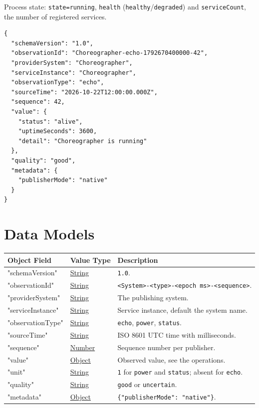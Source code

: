 \documentclass[a4paper]{arrowhead}
\newcommand{\oref}[1]{{\textcolor{ArrowheadBlue}{\hyperref[sec:operations:#1]{#1}}}}
\newcommand{\pref}[1]{{\textcolor{ArrowheadGrey}{\hyperref[sec:model:primitives:#1]{#1}}}}
\begin{document}
Process state: \texttt{state=\allowbreak{}running}, \texttt{health} (\texttt{healthy}/\texttt{degraded}) and \texttt{serviceCount}, the number of registered services.

\begin{lstlisting}[caption={An \oref{echo} observation.}]
{
  "schemaVersion": "1.0",
  "observationId": "Choreographer-echo-1792670400000-42",
  "providerSystem": "Choreographer",
  "serviceInstance": "Choreographer",
  "observationType": "echo",
  "sourceTime": "2026-10-22T12:00:00.000Z",
  "sequence": 42,
  "value": {
    "status": "alive",
    "uptimeSeconds": 3600,
    "detail": "Choreographer is running"
  },
  "quality": "good",
  "metadata": {
    "publisherMode": "native"
  }
}
\end{lstlisting}

\newpage

\section{Data Models}
\label{sec:model}


\noindent\begin{tabularx}{\textwidth}{| p{4.25cm} | p{3.5cm} | X |} \hline
\rowcolor{gray!33} Object Field & Value Type & Description \\ \hline
"schemaVersion" & \pref{String} & \texttt{1.0}. \\ \hline
"observationId" & \pref{String} & \texttt{<System>-<type>-<epoch ms>-<sequence>}. \\ \hline
"providerSystem" & \pref{String} & The publishing system. \\ \hline
"serviceInstance" & \pref{String} & Service instance, default the system name. \\ \hline
"observationType" & \pref{String} & \texttt{echo}, \texttt{power}, \texttt{status}. \\ \hline
"sourceTime" & \pref{String} & ISO 8601 UTC time with milliseconds. \\ \hline
"sequence" & \pref{Number} & Sequence number per publisher. \\ \hline
"value" & \pref{Object} & Observed value, see the operations. \\ \hline
"unit" & \pref{String} & \texttt{1} for \texttt{power} and \texttt{status}; absent for \texttt{echo}. \\ \hline
"quality" & \pref{String} & \texttt{good} or \texttt{uncertain}. \\ \hline
"metadata" & \pref{Object} & \texttt{\{"publisherMode": "native"\}}. \\ \hline
\end{tabularx}
\end{document}
